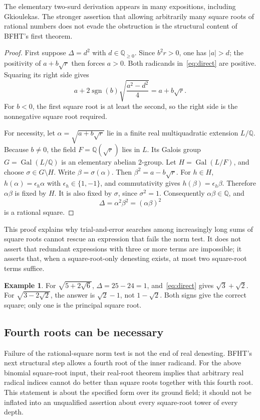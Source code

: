 \documentclass[11pt,a4paper]{article}
\newcommand{\Q}{\mathbb{Q}}
\newcommand{\Gal}{\operatorname{Gal}}
\newcommand{\sgn}{\operatorname{sgn}}
\theoremstyle{definition}
\newtheorem{example}[theorem]{Example}
\theoremstyle{remark}
\numberwithin{equation}{section}
\begin{document}
The elementary two-surd derivation appears in many expositions, including Gkioulekas. The stronger assertion that allowing arbitrarily many square roots of rational numbers does not evade the obstruction is the structural content of BFHT's first theorem.\cite{bfht,gkioulekas}

\begin{proof}
First suppose $\Delta=d^2$ with $d\in\Q_{\ge0}$. Since $b^2r>0$, one has $|a|>d$; the positivity of $a+b\sqrt r$ then forces $a>0$. Both radicands in~\eqref{eq:direct} are positive. Squaring its right side gives
\[
 a+2\sgn(b)\sqrt{\frac{a^2-d^2}{4}}=a+b\sqrt r.
\]
For $b<0$, the first square root is at least the second, so the right side is the nonnegative square root required.

For necessity, let $\alpha=\sqrt{a+b\sqrt r}$ lie in a finite real multiquadratic extension $L/\Q$. Because $b\ne0$, the field $F=\Q(\sqrt r)$ lies in $L$. Its Galois group $G=\Gal(L/\Q)$ is an elementary abelian $2$-group. Let $H=\Gal(L/F)$, and choose $\sigma\in G\setminus H$. Write $\beta=\sigma(\alpha)$. Then $\beta^2=a-b\sqrt r$. For $h\in H$, $h(\alpha)=\epsilon_h\alpha$ with $\epsilon_h\in\{1,-1\}$, and commutativity gives $h(\beta)=\epsilon_h\beta$. Therefore $\alpha\beta$ is fixed by $H$. It is also fixed by $\sigma$, since $\sigma^2=1$. Consequently $\alpha\beta\in\Q$, and
\[
 \Delta=\alpha^2\beta^2=(\alpha\beta)^2
\]
is a rational square.
\end{proof}

This proof explains why trial-and-error searches among increasingly long sums of square roots cannot rescue an expression that fails the norm test. It does not assert that redundant expressions with three or more terms are impossible; it asserts that, when a square-root-only denesting exists, at most two square-root terms suffice.

\begin{example}
For $\sqrt{5+2\sqrt6}$, $\Delta=25-24=1$, and~\eqref{eq:direct} gives $\sqrt3+\sqrt2$. For $\sqrt{3-2\sqrt2}$, the answer is $\sqrt2-1$, not $1-\sqrt2$. Both signs give the correct square; only one is the principal square root.
\end{example}

\subsection{Fourth roots can be necessary}
\label{sec:fourth}

Failure of the rational-square norm test is not the end of real denesting. BFHT's next structural step allows a fourth root of the inner radicand. For the above binomial square-root input, their real-root theorem implies that arbitrary real radical indices cannot do better than square roots together with this fourth root. This statement is about the specified form over its ground field; it should not be inflated into an unqualified assertion about every square-root tower of every depth.\cite{bfht}
\end{document}
